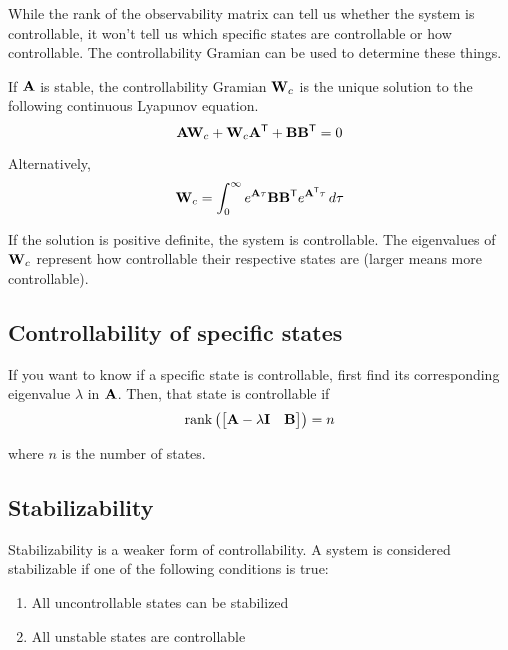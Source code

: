While the rank of the observability matrix can tell us whether the system is
controllable, it won't tell us which specific states are controllable or how
controllable. The controllability Gramian can be used to determine these things.

If $\mathbf{A}$ is stable, the controllability Gramian $\mathbf{W}_c$ is the unique
solution to the following continuous Lyapunov equation.
\begin{equation}
  \mathbf{A}\mathbf{W}_c + \mathbf{W}_c\mathbf{A}^\mathsf{T} + \mathbf{B}\mathbf{B}^\mathsf{T} = 0
\end{equation}

Alternatively,
\begin{equation}
  \mathbf{W}_c =
    \int_0^\infty e^{\mathbf{A}\tau} \mathbf{B}\mathbf{B}^\mathsf{T} e^{\mathbf{A}^\mathsf{T}\tau} \,d\tau
\end{equation}

If the solution is positive definite, the system is controllable. The
eigenvalues of $\mathbf{W}_c$ represent how controllable their respective states
are (larger means more controllable).

\subsection{Controllability of specific states}

If you want to know if a specific state is controllable, first find its
corresponding eigenvalue $\lambda$ in $\mathbf{A}$. Then, that state is
controllable if
\begin{equation}
  \operatorname{rank}\left(
  \begin{bmatrix}
    \mathbf{A} - \lambda\mathbf{I} & \mathbf{B}
  \end{bmatrix}\right) = n
\end{equation}

where $n$ is the number of \glspl{state}.

\subsection{Stabilizability}

Stabilizability is a weaker form of controllability. A system is considered
stabilizable if one of the following conditions is true:
\begin{enumerate}
  \item All uncontrollable states can be stabilized
  \item All unstable states are controllable
\end{enumerate}
